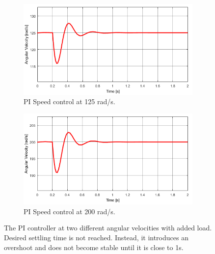 \begin{figure}[h!]
	\centering
	\begin{subfigure}[b]{0.45\textwidth}
		\includegraphics[width=\textwidth]{graphics/PI_load125}
		\caption{PI Speed control at 125 rad/s.}
		\label{fig:piload125}
	\end{subfigure}
	\begin{subfigure}[b]{0.45\textwidth}
		\includegraphics[width=\textwidth]{graphics/PI_load200}
		\caption{PI Speed control at 200 rad/s.}
		\label{fig:piload200}
	\end{subfigure}
	\caption[The PI controller at two different angular velocities with added load.]{The PI controller at two different angular velocities with added load. Desired settling time is not reached. Instead, it introduces an overshoot and does not become stable until it is close to 1s.}
	\label{fig:piload}
\end{figure}

